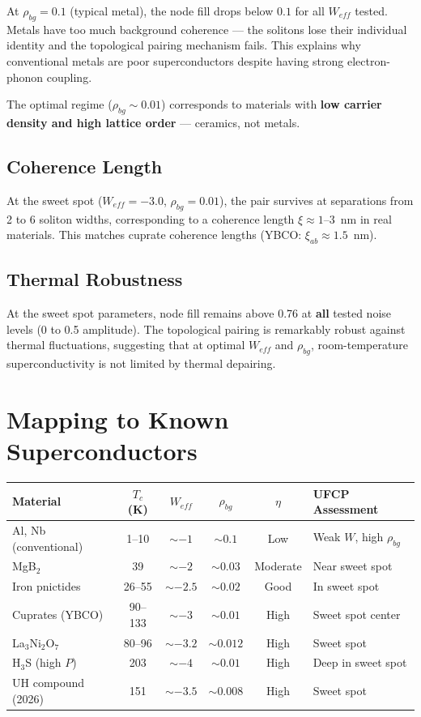 \documentclass[11pt, a4paper]{article}
\begin{document}
At $\rho_{bg} = 0.1$ (typical metal), the node fill drops below
$0.1$ for all $W_{eff}$ tested. Metals have too much background
coherence --- the solitons lose their individual identity and the
topological pairing mechanism fails. This explains why conventional
metals are poor superconductors despite having strong electron-phonon
coupling.

The optimal regime ($\rho_{bg} \sim 0.01$) corresponds to materials
with \textbf{low carrier density and high lattice order} --- ceramics,
not metals.

\subsection{Coherence Length}

At the sweet spot ($W_{eff} = -3.0$, $\rho_{bg} = 0.01$), the pair
survives at separations from 2 to 6 soliton widths, corresponding
to a coherence length $\xi \approx 1$--3~nm in real materials.
This matches cuprate coherence lengths (YBCO: $\xi_{ab} \approx 1.5$~nm).

\subsection{Thermal Robustness}

At the sweet spot parameters, node fill remains above 0.76 at
\textbf{all} tested noise levels (0 to 0.5 amplitude). The
topological pairing is remarkably robust against thermal fluctuations,
suggesting that at optimal $W_{eff}$ and $\rho_{bg}$, room-temperature
superconductivity is not limited by thermal depairing.

\section{Mapping to Known Superconductors}

\begin{center}
\begin{tabular}{@{}lccccl@{}}
\toprule
\textbf{Material} & $T_c$ (K) & $W_{eff}$ & $\rho_{bg}$ &
  $\eta$ & \textbf{UFCP Assessment} \\
\midrule
Al, Nb (conventional) & 1--10 & $\sim -1$ & $\sim 0.1$ &
  Low & Weak $W$, high $\rho_{bg}$ \\
MgB$_2$ & 39 & $\sim -2$ & $\sim 0.03$ &
  Moderate & Near sweet spot \\
Iron pnictides & 26--55 & $\sim -2.5$ & $\sim 0.02$ &
  Good & In sweet spot \\
Cuprates (YBCO) & 90--133 & $\sim -3$ & $\sim 0.01$ &
  High & Sweet spot center \\
La$_3$Ni$_2$O$_7$ & 80--96 & $\sim -3.2$ & $\sim 0.012$ &
  High & Sweet spot \\
H$_3$S (high $P$) & 203 & $\sim -4$ & $\sim 0.01$ &
  High & Deep in sweet spot \\
UH compound (2026) & 151 & $\sim -3.5$ & $\sim 0.008$ &
  High & Sweet spot \\
\bottomrule
\end{tabular}
\end{center}
\end{document}
